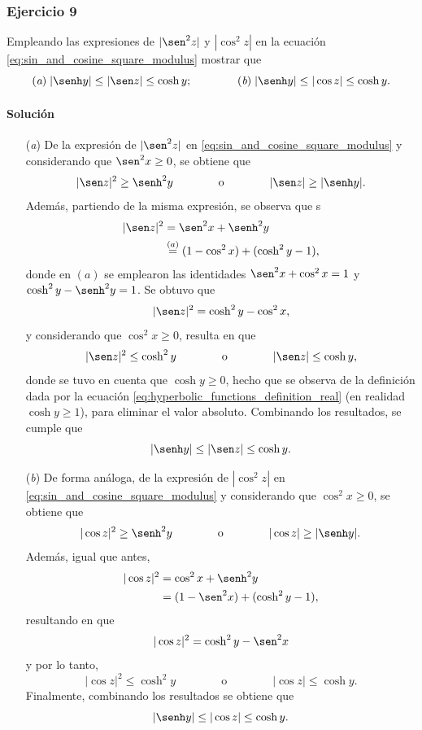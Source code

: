 \documentclass[a4paper]{report}
\begin{document}
\subsubsection{Ejercicio 9}

Empleando las expresiones de \(|\sen^2z|\) y \(|\cos^2z|\) en la ecuación \ref{eq:sin_and_cosine_square_modulus} mostrar que 
\[
 (\textit{a})\;|\senh y|\leq|\sen z|\leq\cosh y;\qquad\qquad (\textit{b})\;|\senh y|\leq|\cos z|\leq\cosh y.
\]

\paragraph{Solución} 
\begin{enumerate}
 \item[(\textit{a})] De la expresión de \(|\sen^2z|\) en \ref{eq:sin_and_cosine_square_modulus} y considerando que \(\sen^2x\geq 0\), se obtiene que 
 \[
  |\sen z|^2\geq\senh^2y
  \qquad\qquad\textrm{o}\qquad\qquad
  |\sen z|\geq|\senh y|.
 \]
 Además, partiendo de la misma expresión, se observa que s 
 \begin{align*}
  |\sen z|^2&=\sen^2x+\senh^2y\\
   &\overset{(a)}{=}(1-\cos^2x)+(\cosh^2y-1),
 \end{align*}
 donde en \((a)\) se emplearon las identidades \(\sen^2x+\cos^2x=1\) y \(\cosh^2y-\senh^2y=1\). Se obtuvo que  
 \begin{equation}\label{eq:sin_and_cosine_square_modulus_alt_sin}
  |\sen z|^2=\cosh^2y-\cos^2x,  
 \end{equation}
 y considerando que \(\cos^2x\geq0\), resulta en que 
 \[
  |\sen z|^2\leq\cosh^2y
  \qquad\qquad\textrm{o}\qquad\qquad
  |\sen z|\leq\cosh y,
 \]
 donde se tuvo en cuenta que \(\cosh y\geq0\), hecho que se observa de la definición dada por la ecuación \ref{eq:hyperbolic_functions_definition_real} (en realidad \(\cosh y\geq1\)), para eliminar el valor absoluto. Combinando los resultados, se cumple que 
 \[
  |\senh y|\leq|\sen z|\leq\cosh y.
 \]
 \item[(\textit{b})] De forma análoga, de la expresión de \(|\cos^2z|\) en \ref{eq:sin_and_cosine_square_modulus} y considerando que \(\cos^2x\geq 0\), se obtiene que 
 \[
  |\cos z|^2\geq\senh^2y
  \qquad\qquad\textrm{o}\qquad\qquad
  |\cos z|\geq|\senh y|.
 \]
 Además, igual que antes,
  \begin{align*}
  |\cos z|^2&=\cos^2x+\senh^2y\\
   &=(1-\sen^2x)+(\cosh^2y-1),
 \end{align*}
 resultando en que 
 \begin{equation}\label{eq:sin_and_cosine_square_modulus_alt_cos}
  |\cos z|^2=\cosh^2y-\sen^2x  
 \end{equation}
 y por lo tanto,
 \[
  |\cos z|^2\leq\cosh^2y
  \qquad\qquad\textrm{o}\qquad\qquad
  |\cos z|\leq\cosh y.
 \]
 Finalmente, combinando los resultados se obtiene que 
 \[
  |\senh y|\leq|\cos z|\leq\cosh y.
 \] 
\end{enumerate} 
\end{document}

